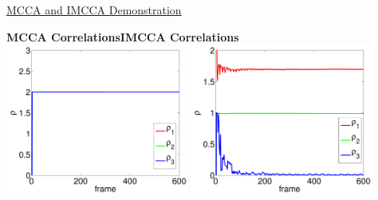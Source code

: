 \documentclass[8pt]{beamer}
\begin{document}
\begin{frame}{\href{run:/home/user/Documents/thesis_vids/mcca_flashing.mp4}{MCCA and
      IMCCA Demonstration}} 



    \begin{center}
      \textbf{MCCA Correlations}\hspace{20ex}\textbf{IMCCA Correlations}
        \includegraphics[width=0.45\textwidth]{figures/mcca_cca_corrs.pdf}\hspace{2ex}
        \includegraphics[width=0.45\textwidth]{figures/mcca_icca_corrs.pdf}
    \end{center}

\end{frame}
\end{document}
